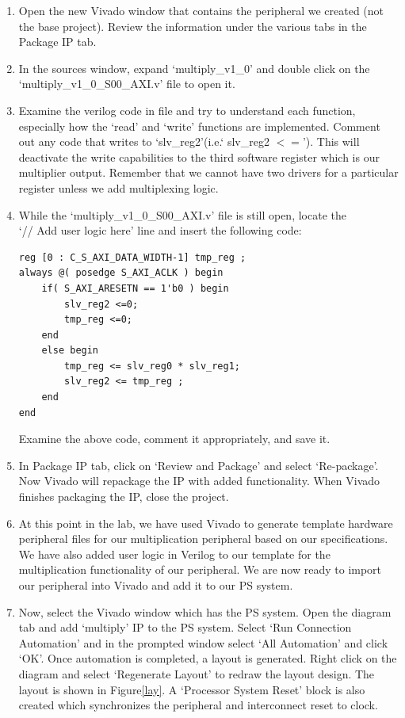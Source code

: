 \documentclass[11pt,twoside,titlepage]{article}
\begin{document}
\begin{enumerate}
	
	\item Open the new Vivado window that contains the peripheral we created (not the base project). Review the information under the various tabs in the Package IP tab.
	\item In the sources window, expand `multiply\_v1\_0' and double click on the `multiply\_v1\_0\_S00\_AXI.v' file to open it.
	
	\item Examine the verilog code in file and try to understand each function, especially how the `read' and `write' functions are implemented. Comment out any code that writes to `slv\_reg2'(i.e.` slv\_reg2 $<=$'). This will deactivate the write capabilities to the third software register which is our multiplier output. Remember that we cannot have two drivers for a particular register unless we add multiplexing logic.
	
	\item While the `multiply\_v1\_0\_S00\_AXI.v' file is still open, locate the \\
	`// Add user logic here' line and insert the
	following code:
	\begin{lstlisting}
reg [0 : C_S_AXI_DATA_WIDTH-1] tmp_reg ;
always @( posedge S_AXI_ACLK ) begin
	if( S_AXI_ARESETN == 1'b0 ) begin
		slv_reg2 <=0;
		tmp_reg <=0;
	end
	else begin
		tmp_reg <= slv_reg0 * slv_reg1;
		slv_reg2 <= tmp_reg ;
	end
end
	\end{lstlisting}
	
	Examine the above code, comment it appropriately, and save it.
	\item In Package IP tab, click on `Review and Package' and select `Re-package'. Now Vivado will repackage the IP with added functionality. When Vivado finishes packaging the IP, close the project.
	
	\item At this point in the lab, we have used Vivado to generate template hardware peripheral files for our multiplication peripheral based on our specifications. We have also added user logic in Verilog to our template for the multiplication functionality of our peripheral. We are now ready to import our peripheral into Vivado and add it to our PS system.
	
	\item Now, select the Vivado window which has the PS system. Open the diagram tab and add `multiply' IP to the PS system. Select `Run Connection Automation' and in the prompted window select `All Automation' and click `OK'. Once automation is completed, a layout is generated. Right click on the diagram and select `Regenerate Layout' to redraw the layout design. The layout is shown in Figure\ref{lay}. A `Processor System Reset' block is also created which synchronizes the peripheral and interconnect reset to clock.
	

\end{enumerate}
\end{document}
